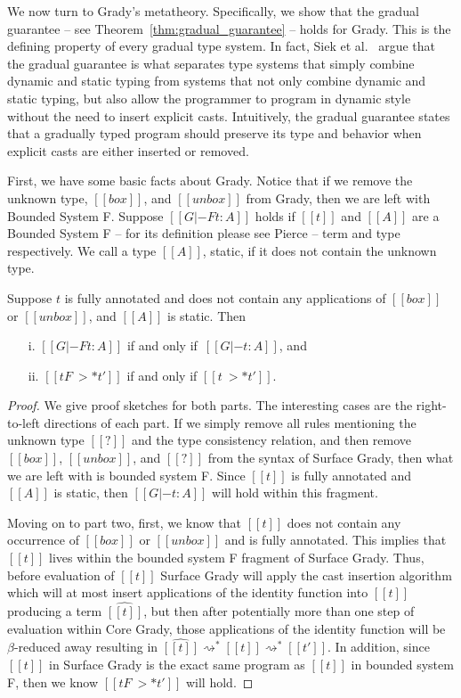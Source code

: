 We now turn to Grady's metatheory.  Specifically, we show that the
gradual guarantee -- see Theorem~\ref{thm:gradual_guarantee} -- holds
for Grady.  This is the defining property of every gradual type
system.  In fact, Siek et al.~\cite{Siek:2015} argue that the gradual
guarantee is what separates type systems that simply combine dynamic
and static typing from systems that not only combine dynamic and
static typing, but also allow the programmer to program in dynamic
style without the need to insert explicit casts.  Intuitively, the
gradual guarantee states that a gradually typed program should
preserve its type and behavior when explicit casts are either inserted
or removed.

First, we have some basic facts about Grady.  Notice that if we remove
the unknown type, $[[box]]$, and $[[unbox]]$ from Grady, then we are
left with Bounded System F.  Suppose $[[G |-F t : A]]$ holds if
$[[t]]$ and $[[A]]$ are a Bounded System F -- for its definition
please see Pierce\cite{Pierce:2002:TPL:509043} -- term and type
respectively.  We call a type $[[A]]$, static, if it does not contain
the unknown type.
\begin{lemma}
  \label{lemma:F-inclusion}
  Suppose $t$ is fully annotated and does not contain any applications
  of $[[box]]$ or $[[unbox]]$, and $[[A]]$ is static.  Then
  \begin{itemize}
  \item[i.] $[[G |-F t : A]]$ if and only if $\,[[G |- t : A]]$, and 
  \item[ii.] $[[t F~>* t']]$ if and only if $[[t ~>* t']]$.
  \end{itemize}
\end{lemma}
\begin{proof}
  We give proof sketches for both parts.  The interesting cases are
  the right-to-left directions of each part.  If we simply remove all
  rules mentioning the unknown type $[[?]]$ and the type consistency
  relation, and then remove $[[box]]$, $[[unbox]]$, and $[[?]]$ from
  the syntax of Surface Grady, then what we are left with is bounded
  system F.  Since $[[t]]$ is fully annotated and $[[A]]$ is static,
  then $[[G |- t : A]]$ will hold within this fragment.

  Moving on to part two, first, we know that $[[t]]$ does not contain
  any occurrence of $[[box]]$ or $[[unbox]]$ and is fully annotated.
  This implies that $[[t]]$ lives within the bounded system F fragment
  of Surface Grady. Thus, before evaluation of $[[t]]$ Surface Grady
  will apply the cast insertion algorithm which will at most insert
  applications of the identity function into $[[t]]$ producing a term
  $\widehat{[[t]]}$, but then after potentially more than one step of
  evaluation within Core Grady, those applications of the identity
  function will be $\beta$-reduced away resulting in $\widehat{[[t]]}
  \rightsquigarrow^* [[t]] \rightsquigarrow^* [[t']]$.  In addition,
  since $[[t]]$ in Surface Grady is the exact same program as $[[t]]$
  in bounded system F, then we know $[[t F~>* t']]$ will hold.
\end{proof}
